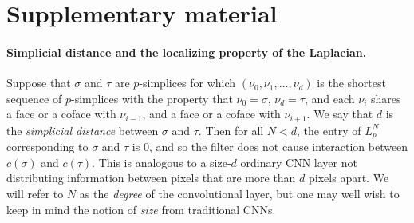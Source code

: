 \section{Supplementary material}\label{sec:supp_material}

\paragraph{Simplicial distance and the localizing property of the Laplacian.}
Suppose that $\sigma$ and $\tau$ are $p$-simplices for which $(\nu_0, \nu_1, \dotsc, \nu_d)$ is the shortest sequence of $p$-simplices with the property that $\nu_0=\sigma$, $\nu_d=\tau$, and each $\nu_i$ shares a face or a coface with $\nu_{i-1}$, and a face or a coface with $\nu_{i+1}$. We say that $d$ is the \emph{simplicial distance} between $\sigma$ and $\tau$. Then for all $N<d$, the entry of $L_p^N$ corresponding to $\sigma$ and $\tau$ is $0$, and so the filter does not cause interaction between $c(\sigma)$ and $c(\tau)$. This is analogous to a size-$d$ ordinary CNN layer not distributing information between pixels that are more than $d$ pixels apart. We will refer to $N$ as the \emph{degree} of the convolutional layer, but one may well wish to keep in mind the notion of \emph{size} from traditional CNNs.

